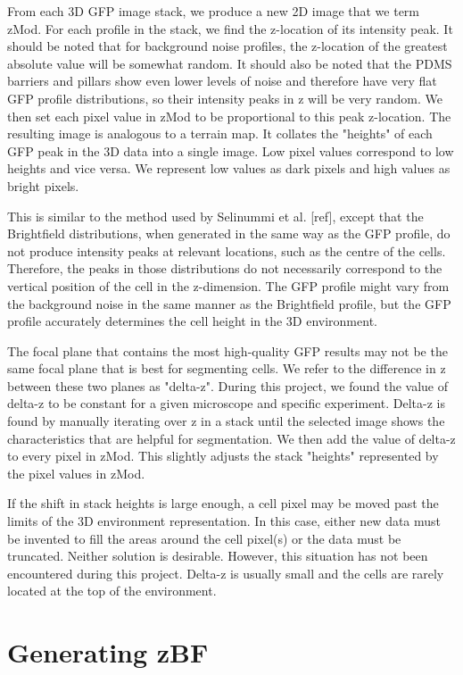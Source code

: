 From each 3D GFP image stack, we produce a new 2D image that we term zMod. For each profile in the stack, we find the z-location of its intensity peak. It should be noted that for background noise profiles, the z-location of the greatest absolute value will be somewhat random. It should also be noted that the PDMS barriers and pillars show even lower levels of noise and therefore have very flat GFP profile distributions, so their intensity peaks in z will be very random. We then set each pixel value in zMod to be proportional to this peak z-location. The resulting image is analogous to a terrain map. It collates the "heights" of each GFP peak in the 3D data into a single image. Low pixel values correspond to low heights and vice versa. We represent low values as dark pixels and high values as bright pixels.

This is similar to the method used by Selinummi et al. [ref], except that the Brightfield distributions, when generated in the same way as the GFP profile, do not produce intensity peaks at relevant locations, such as the centre of the cells. Therefore, the peaks in those distributions do not necessarily correspond to the vertical position of the cell in the z-dimension. The GFP profile might vary from the background noise in the same manner as the Brightfield profile, but the GFP profile accurately determines the cell height in the 3D environment.

The focal plane that contains the most high-quality GFP results may not be the same focal plane that is best for segmenting cells. We refer to the difference in z between these two planes as "delta-z". During this project, we found the value of delta-z to be constant for a given microscope and specific experiment. Delta-z is found by manually iterating over z in a stack until the selected image shows the characteristics that are helpful for segmentation. We then add the value of delta-z to every pixel in zMod. This slightly adjusts the stack "heights" represented by the pixel values in zMod.

If the shift in stack heights is large enough, a cell pixel may be moved past the limits of the 3D environment representation. In this case, either new data must be invented to fill the areas around the cell pixel(s) or the data must be truncated. Neither solution is desirable. However, this situation has not been encountered during this project. Delta-z is usually small and the cells are rarely located at the top of the environment.

\section{Generating zBF}

